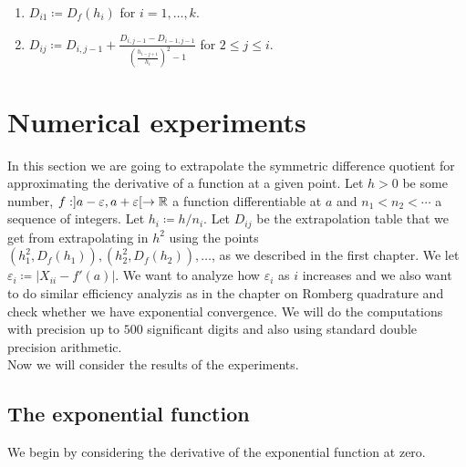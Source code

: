 \begin{enumerate}
    \item \(D_{i1} \coloneqq D_f(h_i)\) for \(i = 1,\ldots,k\).
    \item \(D_{ij} \coloneqq D_{i,j-1} + \frac{D_{i,j-1} - D_{i-1,j-1}}{\left(\frac{h_{i-j+1}}{h_i}\right)^2 - 1}\) for \(2\leq j\leq i\).
\end{enumerate}

\section{Numerical experiments}

In this section we are going to extrapolate the symmetric difference quotient for approximating the derivative of a function at a given point. Let \(h > 0\) be some number, \(f: ]a-\varepsilon, a+\varepsilon[\rightarrow \mathbb{R}\) a function differentiable at \(a\) and \(n_1 < n_2 < \cdots\) a sequence of integers. Let \(h_i \coloneqq h/n_i\). Let \(D_{ij}\) be the extrapolation table that we get from extrapolating in \(h^2\) using the points \((h_1^2,D_f(h_1)),(h_2^2,D_f(h_2)),\ldots\), as we described in the first chapter. We let \(\varepsilon_i \coloneqq |X_{ii} - f'(a)|\). We want to analyze how \(\varepsilon_i\) as \(i\) increases and we also want to do similar efficiency analyzis as in the chapter on Romberg quadrature and check whether we have exponential convergence. We will do the computations with precision up to \(500\) significant digits and also using standard double precision arithmetic.\\

Now we will consider the results of the experiments.

\subsection{The exponential function}

We begin by considering the derivative of the exponential function at zero. 

